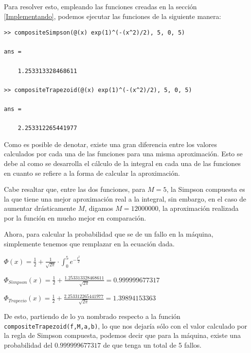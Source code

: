 \documentclass[english,notitlepage,letterpaper, 10pt]{article} %
\begin{document}
    Para resolver esto, empleando las funciones creadas en la sección \ref{Implementando}, podemos ejecutar las funciones de la siguiente manera:

    \begin{lstlisting}
>> compositeSimpson(@(x) exp(1)^(-(x^2)/2), 5, 0, 5)

ans =

    1.253313328468611

>> compositeTrapezoid(@(x) exp(1)^(-(x^2)/2), 5, 0, 5)

ans =

    2.253312265441977
    \end{lstlisting}

    Como es posible de denotar, existe una gran diferencia entre los valores calculados por cada una de las funciones para una misma aproximación. Esto se debe al como se desarrolla el cálculo de la integral en cada una de las funciones en cuanto se refiere a la forma de calcular la aproximación. 

    Cabe resaltar que, entre las dos funciones, para $M=5$, la Simpson compuesta es la que tiene una mejor aproximación real a la integral, sin embargo, en el caso de aumentar drásticamente $M$, digamos $M=12000000$, la aproximación realizada por la función en mucho mejor en comparación.

    Ahora, para calcular la probabilidad que se de un fallo en la máquina, simplemente tenemos que remplazar en la ecuación dada.

    \begin{center}
      \begin{math}
        \displaystyle \Phi(x) = \frac{1}{2}+\frac{1}{\sqrt{2\pi}} \cdot \int^5_0 e^{-\frac{t^2}{2}} 
      \end{math}

      \begin{math}
        \displaystyle \Phi_{Simpson}(x) = \frac{1}{2}+\frac{1.253313328468611}{\sqrt{2\pi}} = 0.999999677317
      \end{math}

      \begin{math}
        \displaystyle \Phi_{Trapecio}(x) = \frac{1}{2} + \frac{2.253312265441977}{\sqrt{2\pi}} = 1.39894153363 
      \end{math}
    \end{center}

    De esto, partiendo de lo ya nombrado respecto a la función \texttt{compositeTrapezoid(f,M,a,b)}, lo que nos dejaría sólo con el valor calculado por la regla de Simpson compuesta, podemos decir que para la máquina, existe una probabilidad del $0.999999677317$ de que tenga un total de 5 fallos.
\end{document}
